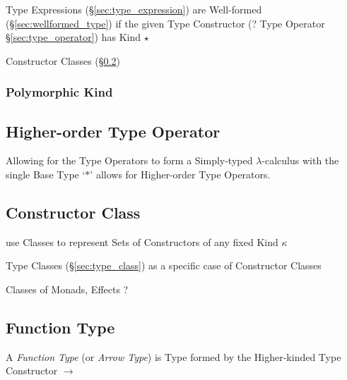 Type Expressions (\S\ref{sec:type_expression}) are Well-formed
(\S\ref{sec:wellformed_type}) if the given Type Constructor (? Type
Operator \S\ref{sec:type_operator}) has Kind $\star$

Constructor Classes (\S\ref{sec:constructor_class})



\subsubsection{Polymorphic Kind}\label{sec:polymorphic_kind}



\subsection{Higher-order Type Operator}
\label{sec:higherorder_typeoperator}

Allowing for the Type Operators to form a Simply-typed
$\lambda$-calculus with the single Base Type `$*$' allows for
Higher-order Type Operators.



\subsection{Constructor Class}\label{sec:constructor_class}

use Classes to represent Sets of Constructors of any fixed Kind
$\kappa$

Type Classes (\S\ref{sec:type_class}) as a specific case of
Constructor Classes

Classes of Monads, Effects ?



\subsection{Function Type}\label{sec:function_type}

A \emph{Function Type} (or \emph{Arrow Type}) is Type formed by the
Higher-kinded Type Constructor $\rightarrow$


